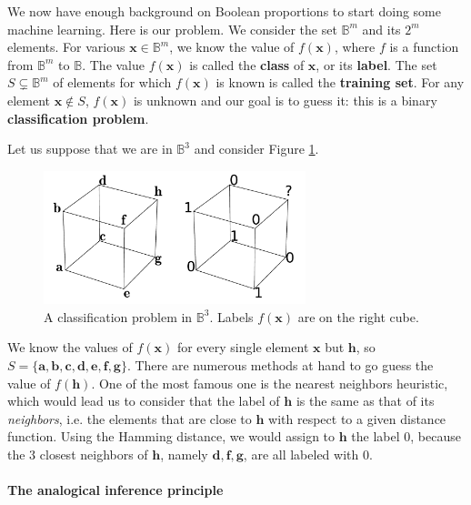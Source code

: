 We now have enough background on Boolean proportions to start doing some
machine learning. Here is our problem. We consider the set $\mathbb{B}^m$ and
its $2^m$ elements. For various $\mathbf{x} \in \mathbb{B}^m$, we know the
value of $f(\mathbf{x})$, where $f$ is a function from $\mathbb{B}^m$ to
$\mathbb{B}$.  The value $f(\mathbf{x})$ is called the \textbf{class} of
$\mathbf{x}$, or its \textbf{label}. The set $S \subsetneq \mathbb{B}^m$ of
elements for which $f(\mathbf{x})$ is known is called the \textbf{training
set}. For any element $\mathbf{x} \notin S$, $f(\mathbf{x})$ is unknown and our
goal is to guess it: this is a binary \textbf{classification problem}.

Let us suppose that we are in $\mathbb{B}^3$ and consider Figure
\ref{FIG:classification_problem}.
\begin{figure}[!h]
\centering
  \includegraphics[width=3in]{figures/classification_problem.pdf}
  \caption{A classification problem in $\mathbb{B}^3$. Labels $f(\mathbf{x})$
  are on the right cube.}
\label{FIG:classification_problem}
\end{figure}
We know the values of $f(\mathbf{x})$ for
every single element $\mathbf{x}$ but $\mathbf{h}$, so $S = \{ \mathbf{a}, \mathbf{b},
\mathbf{c}, \mathbf{d}, \mathbf{e}, \mathbf{f}, \mathbf{g}\}$. There are
numerous methods at hand to go guess the value of $f(\mathbf{h})$. One of the
most famous one is the nearest neighbors heuristic, which would lead us to
consider that the label of $\mathbf{h}$ is the same as  that of its
\textit{neighbors}, i.e. the elements that are close to $\mathbf{h}$ with
respect to a given distance function. Using the Hamming distance, we would
assign to $\mathbf{h}$ the label $0$, because the $3$ closest neighbors of
$\mathbf{h}$, namely $\mathbf{d}, \mathbf{f}, \mathbf{g}$, are all labeled with
$0$.

\paragraph{The analogical inference principle\\}

